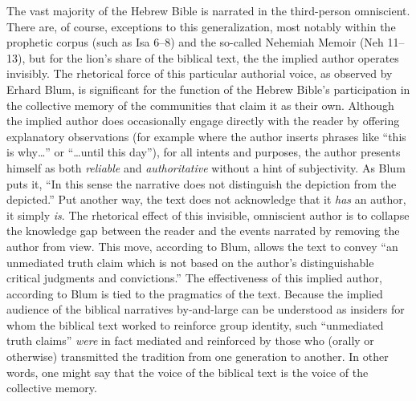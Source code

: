 The vast majority of the Hebrew Bible is narrated in the third-person
omniscient. There are, of course, exceptions to this generalization,
most notably within the prophetic corpus (such as Isa 6--8) and the
so-called Nehemiah Memoir (Neh 11--13), but for the lion's share of the
biblical text, the the implied author operates invisibly. The rhetorical
force of this particular authorial voice, as observed by Erhard Blum, is
significant for the function of the Hebrew Bible's participation in the
collective memory of the communities that claim it as their own.
Although the implied author does occasionally engage directly with the
reader by offering explanatory observations (for example where the
author inserts phrases like ``this is why\ldots{}'' or ``\ldots{}until
this day''), for all intents and purposes, the author presents himself
as both \emph{reliable} and \emph{authoritative} without a hint of
subjectivity. As Blum puts it, ``In this sense the narrative does not
distinguish the depiction from the
depicted.''\autocite[33]{blum_barton-etal2007} Put another way, the text
does not acknowledge that it \emph{has} an author, it simply \emph{is}.
The rhetorical effect of this invisible, omniscient author is to
collapse the knowledge gap between the reader and the events narrated by
removing the author from view. This move, according to Blum, allows the
text to convey ``an unmediated truth claim which is not based on the
author's distinguishable critical judgments and
convictions.''\autocite[33]{blum_barton-etal2007} The effectiveness of
this implied author, according to Blum is tied to the pragmatics of the
text. Because the implied audience of the biblical narratives
by-and-large can be understood as insiders for whom the biblical text
worked to reinforce group identity, such ``unmediated truth claims''
\emph{were} in fact mediated and reinforced by those who (orally or
otherwise) transmitted the tradition from one generation to
another.\autocite[33]{blum_barton-etal2007} In other words, one might
say that the voice of the biblical text is the voice of the collective
memory.\autocite[Blum writes, ``If we assume that the traditional
literature was primarily transmitted through oral means, than the
narrator who is speaking supplies the material with a personal presence;
he is not present as an author who judges and evaluates his sources from
a critical distance, but as a `transmitter' who participates in the
tradition itself and is able to lend it credence through his own
personality, his standing, and/or his
office.''][33]{blum_barton-etal2007}

